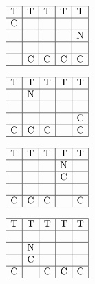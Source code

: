 \begin{minipage}{0.23\textwidth}
	\[
	\begin{array}{|c|c|c|c|c|}
		\hline
		\text{T} & \text{T} & \text{T} & \text{T} & \text{T} \\ 
		\hline
		\text{C} &    &     &    &     \\ 
		\hline
		&   &  &    & \text{N}     \\ 
		\hline
		&   &    &     &     \\ 
		\hline
		& \text{C} & \text{C} & \text{C} & \text{C} \\ 
		\hline
	\end{array}
	\]
\end{minipage}
\begin{minipage}{0.23\textwidth}
	\[
	\begin{array}{|c|c|c|c|c|}
		\hline
		\text{T} & \text{T} & \text{T} & \text{T} & \text{T} \\ 
		\hline
		&   \text{N}   &     &  &     \\ 
		\hline
		&   &  &    &      \\ 
		\hline
		&   &    &     &   \text{C}  \\ 
		\hline
		\text{C} & \text{C} & \text{C} &  & \text{C} \\ 
		\hline
	\end{array}
	\]
\end{minipage}
\begin{minipage}{0.23\textwidth}
\[
\begin{array}{|c|c|c|c|c|}
	\hline
	\text{T} & \text{T} & \text{T} & \text{T} & \text{T} \\ 
	\hline
	&    &     & \text{N} &     \\ 
	\hline
	&   &  &  \text{C}	  &      \\ 
	\hline
	&   &    &     &     \\ 
	\hline
	\text{C} & \text{C} & \text{C} &  & \text{C} \\ 
	\hline
\end{array}
\]
\end{minipage}
\begin{minipage}{0.23\textwidth}
\[
\begin{array}{|c|c|c|c|c|}
	\hline
	\text{T} & \text{T} & \text{T} & \text{T} & \text{T} \\ 
	\hline
	&    &     &  &     \\ 
	\hline
	&  \text{N} &  &  	  &      \\ 
	\hline
	&  \text{C} &    &     &     \\ 
	\hline
	\text{C} &  & \text{C} & \text{C} & \text{C} \\ 
	\hline
\end{array}
\]
\end{minipage}

